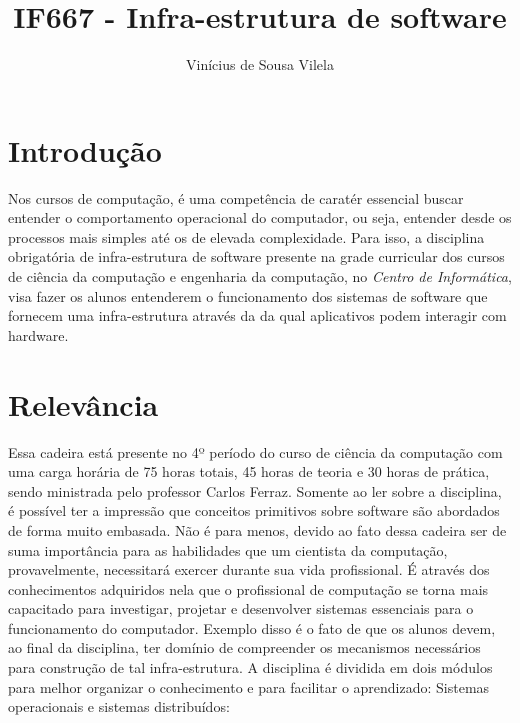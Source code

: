 \documentclass[a4paper]{article}
\title{IF667 - Infra-estrutura de software}
\author{Vinícius de Sousa Vilela}
\begin{document}
\maketitle

\section{Introdução}

Nos cursos de computação, é uma competência de caratér essencial buscar entender o comportamento operacional do computador, ou seja, entender desde os processos mais simples até os de elevada complexidade. Para isso, a disciplina obrigatória de infra-estrutura de software presente na grade curricular dos cursos de ciência da computação e engenharia da computação, no \textit{Centro de Informática}, \cite{CInWiki} visa fazer os alunos entenderem o funcionamento dos sistemas de software que fornecem uma infra-estrutura através da da qual aplicativos podem interagir com hardware.

\section{Relevância}

Essa cadeira está presente no 4º período do curso de ciência da computação com uma carga horária de \cite{SiteDisciplina} 75 horas totais, 45 horas de teoria e 30 horas de prática, sendo ministrada pelo professor Carlos Ferraz. Somente ao ler sobre a disciplina, é possível ter a impressão que conceitos primitivos sobre software são abordados de forma muito embasada. Não é para menos, devido ao fato dessa cadeira ser de suma importância para as habilidades que um cientista da computação, provavelmente, necessitará exercer durante sua vida profissional. É através dos conhecimentos adquiridos nela que o profissional de computação se torna mais capacitado para investigar, projetar e desenvolver sistemas essenciais para o funcionamento do computador. Exemplo disso é o fato de que os alunos devem, ao final da disciplina, ter domínio de compreender os mecanismos necessários para construção de tal infra-estrutura. 
\linebreak 
\newline 
A disciplina é dividida em dois módulos para melhor organizar o conhecimento e para facilitar o aprendizado: Sistemas operacionais e sistemas distribuídos:
\end{document}
